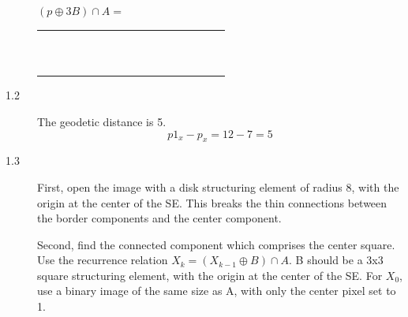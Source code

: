 \documentclass[fleqn]{article}
\begin{document}
\begin{description}
    \begin{math}(p \oplus 3B) \cap A =\end{math}

    \begin{tabular}{| c | c | c | c | c | c | c | c | c | c | c | c | c | c | c | c | c |}
        \hline
        & & & & & & & & & & & & & & & & \\ \hline
        & & & & & & & & & & & & & & & & \\ \hline
        & & & \cellcolor{gray} & \cellcolor{gray} & \cellcolor{gray} & \cellcolor{gray} & \cellcolor{gray} & & & & & & & & & \\ \hline
        & & & \cellcolor{gray} & \cellcolor{gray} & \cellcolor{gray} & \cellcolor{gray} & \cellcolor{gray} & & & & & & & & & \\ \hline
        & & & \cellcolor{gray} & \cellcolor{gray} & \cellcolor{gray} & \cellcolor{gray} & \cellcolor{gray} & & & & & & & & & \\ \hline
        & & & & & \cellcolor{gray} & \cellcolor{gray} & \cellcolor{gray} & \cellcolor{gray} & \cellcolor{gray} & & & & & & & \\ \hline
        & & & \cellcolor{gray} & \cellcolor{gray} & \cellcolor{gray} & \cellcolor{gray} & \cellcolor{gray} & & & & & & & & & \\ \hline
        & & & & & & & & & & & & & & & & \\ \hline
        & & & & & & & & & & & & & & & & \\ \hline
        & & & & & & & & & & & & & & & & \\ \hline
        & & & & & & & & & & & & & & & & \\ \hline
        & & & & & & & & & & & & & & & & \\ \hline
    \end{tabular}

\item [1.2]
    The geodetic distance is 5.
    \begin{displaymath}
        p1_x - p_x = 12 - 7 = 5
    \end{displaymath}

\item [1.3]
    First, open the image with a disk structuring element of radius 8, with the origin at the center of the SE. This breaks the thin connections between the border components and the center component.

    Second, find the connected component which comprises the center square. Use the recurrence relation \begin{math}X_k = (X_{k-1} \oplus B) \cap A\end{math}. B should be a 3x3 square structuring element, with the origin at the center of the SE. For \begin{math}X_0\end{math}, use a binary image of the same size as A, with only the center pixel set to 1.


\end{description}
\end{document}
